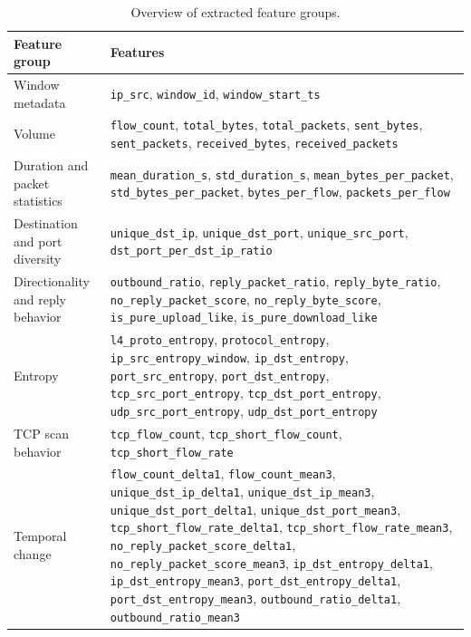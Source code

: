 \begin{table}[htbp]
\centering
\scriptsize
\caption{Overview of extracted feature groups.}
\label{tab:feature_groups}
\renewcommand{\arraystretch}{2}
\begin{tabular}{
    >{\raggedright\arraybackslash}p{}
    >{\raggedright\arraybackslash}p{}
}
\toprule
Feature group & Features \\
\midrule
Window metadata
&
\texttt{ip\_src}, \texttt{window\_id}, \texttt{window\_start\_ts} \\

Volume
&
\texttt{flow\_count}, \texttt{total\_bytes}, \texttt{total\_packets},
\texttt{sent\_bytes}, \texttt{sent\_packets}, \texttt{received\_bytes},
\texttt{received\_packets} \\

Duration and packet statistics
&
\texttt{mean\_duration\_s}, \texttt{std\_duration\_s},
\texttt{mean\_bytes\_per\_packet}, \texttt{std\_bytes\_per\_packet},
\texttt{bytes\_per\_flow}, \texttt{packets\_per\_flow} \\

Destination and port diversity
&
\texttt{unique\_dst\_ip}, \texttt{unique\_dst\_port},
\texttt{unique\_src\_port}, \texttt{dst\_port\_per\_dst\_ip\_ratio} \\

Directionality and reply behavior
&
\texttt{outbound\_ratio}, \texttt{reply\_packet\_ratio},
\texttt{reply\_byte\_ratio}, \texttt{no\_reply\_packet\_score},
\texttt{no\_reply\_byte\_score}, \texttt{is\_pure\_upload\_like},
\texttt{is\_pure\_download\_like} \\

Entropy
&
\texttt{l4\_proto\_entropy}, \texttt{protocol\_entropy},
\texttt{ip\_src\_entropy\_window}, \texttt{ip\_dst\_entropy},
\texttt{port\_src\_entropy}, \texttt{port\_dst\_entropy},
\texttt{tcp\_src\_port\_entropy}, \texttt{tcp\_dst\_port\_entropy},
\texttt{udp\_src\_port\_entropy}, \texttt{udp\_dst\_port\_entropy} \\

TCP scan behavior
&
\texttt{tcp\_flow\_count}, \texttt{tcp\_short\_flow\_count},
\texttt{tcp\_short\_flow\_rate} \\

Temporal change
&
\texttt{flow\_count\_delta1}, \texttt{flow\_count\_mean3},
\texttt{unique\_dst\_ip\_delta1}, \texttt{unique\_dst\_ip\_mean3},
\texttt{unique\_dst\_port\_delta1}, \texttt{unique\_dst\_port\_mean3},
\texttt{tcp\_short\_flow\_rate\_delta1},
\texttt{tcp\_short\_flow\_rate\_mean3},
\texttt{no\_reply\_packet\_score\_delta1},
\texttt{no\_reply\_packet\_score\_mean3},
\texttt{ip\_dst\_entropy\_delta1}, \texttt{ip\_dst\_entropy\_mean3},
\texttt{port\_dst\_entropy\_delta1}, \texttt{port\_dst\_entropy\_mean3},
\texttt{outbound\_ratio\_delta1}, \texttt{outbound\_ratio\_mean3} \\
\bottomrule
\end{tabular}
\renewcommand{\arraystretch}{1.0}
\end{table}

